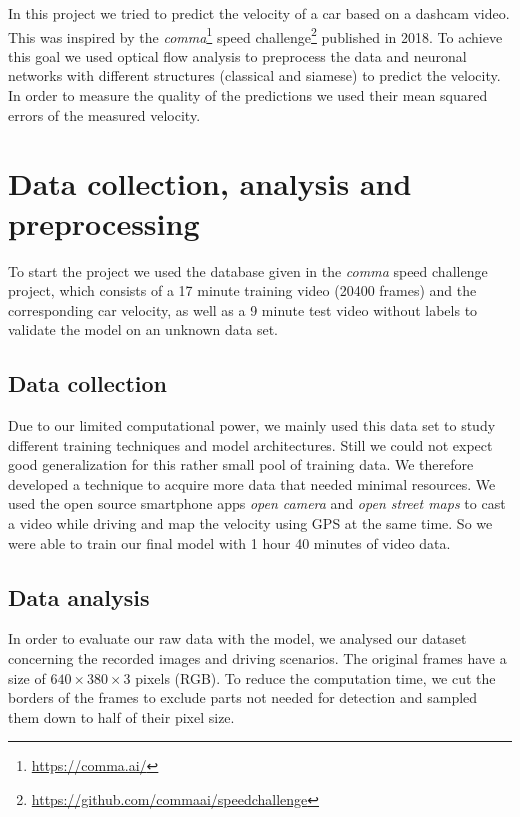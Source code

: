 \documentclass[conference]{IEEEtran}
\begin{document}
In this project we tried to predict the velocity of a car based on a dashcam video. This was inspired by  the \emph{comma}\footnote{\url{https://comma.ai/}} speed challenge\footnote{\url{https://github.com/commaai/speedchallenge}} published in 2018. To achieve this goal we used optical flow analysis to preprocess the data and neuronal networks with different structures (classical and siamese) to predict the velocity. In order to measure the quality of the predictions we used their mean squared errors of the measured velocity.

\section{Data collection, analysis and preprocessing}

To start the project we used the database given in the \emph{comma} speed challenge project, which consists of a 17 minute training video (20400 frames) and the corresponding car velocity, as well as a 9 minute test video without labels to validate the model on an unknown data set.

\subsection{Data collection}

Due to our limited computational power, we mainly used this data set to study different training techniques and model architectures. Still we could not expect good generalization for this rather small pool of training data. We therefore developed a technique to acquire more data that needed minimal resources. We used the open source smartphone apps \emph{open camera} and \emph{open street maps} to cast a video while driving and map the velocity using GPS at the same time. So we were able to train our final model with 1 hour 40 minutes of video data.

\subsection{Data analysis}

In order to evaluate our raw data with the model, we analysed our dataset concerning the recorded images and driving scenarios. The original frames have a size of $640\times380\times3$ pixels (RGB). To reduce the computation time, we cut the borders of the frames to exclude parts not needed for detection and sampled them down to half of their pixel size.
\end{document}
